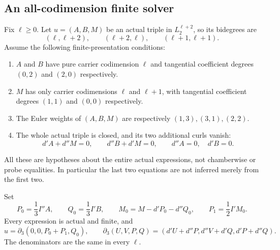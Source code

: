 \subsection{An all-codimension finite solver}

Fix $\ell\ge0$.  Let $u=(A,B,M)$ be an actual triple in
$L_2^{\ell+2}$, so its bidegrees are
\[
 (\ell,\ell+2),\qquad(\ell+2,\ell),\qquad
                         (\ell+1,\ell+1).
 \tag{CE5}
\]
Assume the following finite-presentation conditions:
\begin{enumerate}
\item $A$ and $B$ have pure carrier codimension $\ell$ and
      tangential coefficient degrees $(0,2)$ and $(2,0)$ respectively.
\item $M$ has only carrier codimensions $\ell$ and $\ell+1$,
      with tangential coefficient degrees $(1,1)$ and $(0,0)$ respectively.
\item The Euler weights of $(A,B,M)$ are respectively
      $(1,3),(3,1),(2,2)$.
\item The whole actual triple is closed, and its two additional curls vanish:
\[
 d'A+d''M=0,\qquad d''B+d'M=0,\qquad
                         d''A=0,\quad d'B=0.
 \tag{CE6}
\]
\end{enumerate}
All these are hypotheses about the entire actual expressions, not
chamberwise or probe equalities.  In particular the last two equations
are not inferred merely from the first two.

\begin{theorem}
Set
\[
 P_0=\frac13I''A,\qquad Q_0=\frac13I'B,\qquad
 M_0=M-d'P_0-d''Q_0,\qquad P_1=\frac12I'M_0.
 \tag{CE7}
\]
Every expression is actual and finite, and
\[
 u=\partial_3(0,0,P_0+P_1,Q_0),\qquad
 \partial_3(U,V,P,Q)=(d'U+d''P,d''V+d'Q,d'P+d''Q).
 \tag{CE8}
\]
The denominators are the same in every $\ell$.
\end{theorem}

